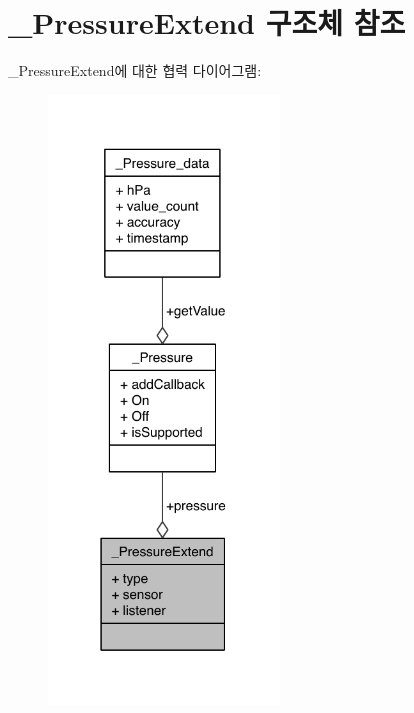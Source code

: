 \hypertarget{struct___pressure_extend}{\section{\-\_\-\-Pressure\-Extend 구조체 참조}
\label{struct___pressure_extend}
}


\-\_\-\-Pressure\-Extend에 대한 협력 다이어그램\-:\nopagebreak
\begin{figure}[H]
\begin{center}
\leavevmode
\includegraphics[width=174pt]{dd/dd1/struct___pressure_extend__coll__graph}
\end{center}
\end{figure}
